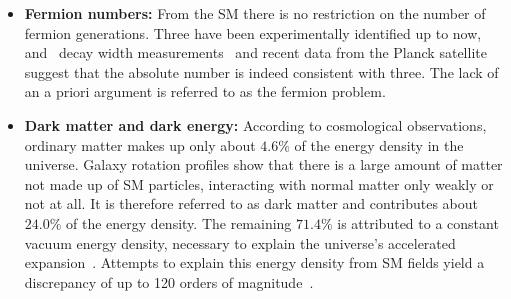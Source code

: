 \begin{itemize}
\item{{\bf Fermion numbers:}}
From the \gls{SM} there is no restriction on the number of fermion generations. Three have been experimentally identified up to now, and \Zboson\ decay width measurements~\cite{ALEPH:2005ab} and recent data from the Planck satellite~\cite{Planck:2015xua} suggest that the absolute number is indeed consistent with three. The lack of an a priori argument is referred to as the fermion problem.
\item{{\bf Dark matter and dark energy:}}
According to cosmological observations, ordinary matter makes up only about $4.6\%$ of the energy density in the universe. Galaxy rotation profiles show that there is a large amount of matter not made up of \gls{SM} particles, interacting with normal matter only weakly or not at all. It is therefore referred to as dark matter and contributes about $24.0\%$ of the energy density. The remaining $71.4\%$ is attributed to a constant vacuum energy density, necessary to explain the universe's accelerated expansion~\cite{0067-0049-208-2-20}. 
%
Attempts to explain this energy density from \gls{SM} fields yield a discrepancy of up to 120 orders of magnitude~\cite{HobsonBook}.
\end{itemize}

